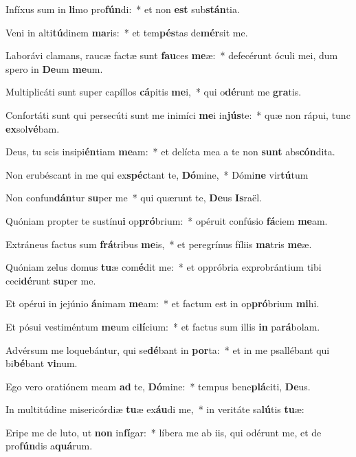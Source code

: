 \item Infíxus sum in \textbf{li}mo pro\textbf{fún}di:~* et non \textbf{est} sub\textbf{stán}tia.
\item Veni in alti\textbf{tú}dinem \textbf{ma}ris:~* et tem\textbf{pés}tas de\textbf{mér}sit me.
\item Laborávi clamans, raucæ factæ sunt \textbf{fau}ces \textbf{me}æ:~* defecérunt óculi mei, dum spero in \textbf{De}um \textbf{me}um.
\item Multiplicáti sunt super capíllos \textbf{cá}pitis \textbf{me}i,~* qui o\textbf{dé}runt me \textbf{gra}tis.
\item Confortáti sunt qui persecúti sunt me inimíci \textbf{me}i in\textbf{jús}te:~* quæ non rápui, tunc \textbf{ex}sol\textbf{vé}bam.
\item Deus, tu scis insipi\textbf{én}tiam \textbf{me}am:~* et delícta mea a te non \textbf{sunt} abs\textbf{cón}dita.
\item Non erubéscant in me qui ex\textbf{spéc}tant te, \textbf{Dó}mine,~* Dómi\textbf{ne} vir\textbf{tú}tum
\item Non confun\textbf{dán}tur \textbf{su}per me~* qui quærunt te, \textbf{De}us \textbf{Is}raël.
\item Quóniam propter te sustínu\textbf{i} op\textbf{pró}brium:~* opéruit confúsio \textbf{fá}ciem \textbf{me}am.
\item Extráneus factus sum \textbf{frá}tribus \textbf{me}is,~* et peregrínus fíliis \textbf{ma}tris \textbf{me}æ.
\item Quóniam zelus domus \textbf{tu}æ com\textbf{é}dit me:~* et oppróbria exprobrántium tibi ceci\textbf{dé}runt \textbf{su}per me.
\item Et opérui in jejúnio \textbf{á}nimam \textbf{me}am:~* et factum est in op\textbf{pró}brium \textbf{mi}hi.
\item Et pósui vestiméntum \textbf{me}um ci\textbf{lí}cium:~* et factus sum illis \textbf{in} pa\textbf{rá}bolam.
\item Advérsum me loquebántur, qui se\textbf{dé}bant in \textbf{por}ta:~* et in me psallébant qui bi\textbf{bé}bant \textbf{vi}num.
\item Ego vero oratiónem meam \textbf{ad} te, \textbf{Dó}mine:~* tempus bene\textbf{plá}citi, \textbf{De}us.
\item In multitúdine misericórdiæ \textbf{tu}æ ex\textbf{áu}di me,~* in veritáte sa\textbf{lú}tis \textbf{tu}æ:
\item Eripe me de luto, ut \textbf{non} in\textbf{fí}gar:~* líbera me ab iis, qui odérunt me, et de pro\textbf{fún}dis a\textbf{quá}rum.
